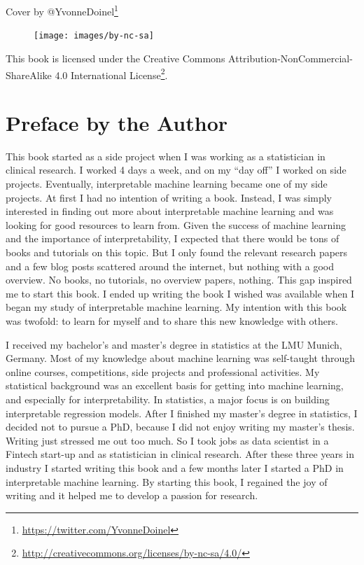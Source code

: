 \documentclass[
  12pt,
]{krantz}
\renewcommand{\href}[2]{#2\footnote{\url{#1}}}
\begin{document}
Cover by \href{https://twitter.com/YvonneDoinel}{@YvonneDoinel}

\begin{figure}

{\centering \texttt{[image: images/by-nc-sa]} 

}

\end{figure}

This book is licensed under the \href{http://creativecommons.org/licenses/by-nc-sa/4.0/}{Creative Commons Attribution-NonCommercial-ShareAlike 4.0 International License}.

\hypertarget{preface-by-the-author}{%
\chapter{Preface by the Author}\label{preface-by-the-author}}

This book started as a side project when I was working as a statistician in clinical research.
I worked 4 days a week, and on my ``day off'' I worked on side projects.
Eventually, interpretable machine learning became one of my side projects.
At first I had no intention of writing a book.
Instead, I was simply interested in finding out more about interpretable machine learning and was looking for good resources to learn from.
Given the success of machine learning and the importance of interpretability, I expected that there would be tons of books and tutorials on this topic.
But I only found the relevant research papers and a few blog posts scattered around the internet, but nothing with a good overview.
No books, no tutorials, no overview papers, nothing.
This gap inspired me to start this book.
I ended up writing the book I wished was available when I began my study of interpretable machine learning.
My intention with this book was twofold: to learn for myself and to share this new knowledge with others.

I received my bachelor's and master's degree in statistics at the LMU Munich, Germany.
Most of my knowledge about machine learning was self-taught through online courses, competitions, side projects and professional activities.
My statistical background was an excellent basis for getting into machine learning, and especially for interpretability.
In statistics, a major focus is on building interpretable regression models.
After I finished my master's degree in statistics, I decided not to pursue a PhD, because I did not enjoy writing my master's thesis.
Writing just stressed me out too much.
So I took jobs as data scientist in a Fintech start-up and as statistician in clinical research.
After these three years in industry I started writing this book and a few months later I started a PhD in interpretable machine learning.
By starting this book, I regained the joy of writing and it helped me to develop a passion for research.
\end{document}
